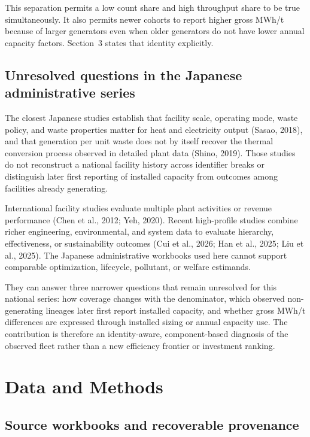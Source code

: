 \documentclass[11pt,letterpaper]{article}
\begin{document}
This separation permits a low count share and high throughput share to be true
simultaneously. It also permits newer cohorts to report higher gross MWh/t
because of larger generators even when older generators do not have lower
annual capacity factors. Section~3 states that identity explicitly.

\subsection{Unresolved questions in the Japanese administrative series}

The closest Japanese studies establish that facility scale, operating mode,
waste policy, and waste properties matter for heat and electricity output
(Sasao, 2018), and that generation per unit waste does not by itself recover the
thermal conversion process observed in detailed plant data (Shino, 2019). Those
studies do not reconstruct a national facility history across identifier breaks
or distinguish later first reporting of installed capacity from outcomes among
facilities already generating.

International facility studies evaluate multiple plant activities or revenue
performance (Chen et al., 2012; Yeh, 2020). Recent high-profile studies combine
richer engineering, environmental, and system data to evaluate hierarchy,
effectiveness, or sustainability outcomes (Cui et al., 2026; Han et al., 2025;
Liu et al., 2025). The Japanese administrative workbooks used here cannot
support comparable optimization, lifecycle, pollutant, or welfare estimands.

They can answer three narrower questions that remain unresolved for this
national series: how coverage changes with the denominator, which observed
non-generating lineages later first report installed capacity, and whether gross
MWh/t differences are expressed through installed sizing or annual capacity use.
The contribution is therefore an identity-aware, component-based diagnosis of
the observed fleet rather than a new efficiency frontier or investment ranking.

\section{Data and Methods}

\subsection{Source workbooks and recoverable provenance}
\end{document}
